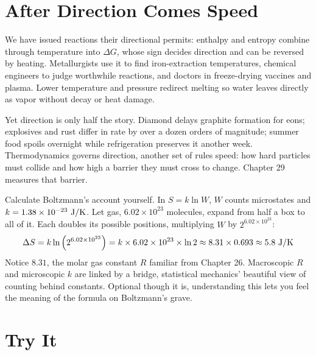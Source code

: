 \section{After Direction Comes Speed}

We have issued reactions their directional permits: enthalpy and entropy combine through temperature into $\Delta G$, whose sign decides direction and can be reversed by heating. Metallurgists use it to find iron-extraction temperatures, chemical engineers to judge worthwhile reactions, and doctors in freeze-drying vaccines and plasma. Lower temperature and pressure redirect melting so water leaves directly as vapor without decay or heat damage.

Yet direction is only half the story. Diamond delays graphite formation for eons; explosives and rust differ in rate by over a dozen orders of magnitude; summer food spoils overnight while refrigeration preserves it another week. Thermodynamics governs direction, another set of rules speed: how hard particles must collide and how high a barrier they must cross to change. Chapter 29 measures that barrier.

\begin{tiaozhan}
Calculate Boltzmann's account yourself. In $S=k\ln W$, $W$ counts microstates and $k=1.38\times10^{-23}\ \mathrm{J/K}$. Let  gas, $6.02\times10^{23}$ molecules, expand from half a box to all of it. Each doubles its possible positions, multiplying $W$ by $2^{6.02\times10^{23}}$:
\[\Delta S = k\ln\left(2^{6.02\times10^{23}}\right) = k\times 6.02\times10^{23}\times\ln 2 \approx 8.31\times 0.693 \approx 5.8\ \mathrm{J/K}\]
Notice $8.31$, the molar gas constant $R$ familiar from Chapter 26. Macroscopic $R$ and microscopic $k$ are linked by a  bridge, statistical mechanics' beautiful view of counting behind constants. Optional though it is, understanding this lets you feel the meaning of the formula on Boltzmann's grave.
\end{tiaozhan}

\section*{Try It}

